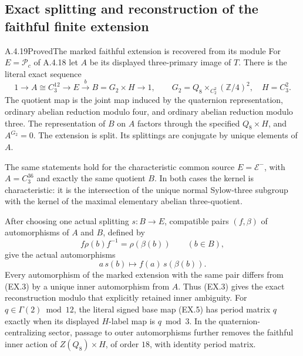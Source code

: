 \subsection{Exact splitting and reconstruction of the faithful finite extension}

\begin{result}{A.4.19}{Proved}{The marked faithful extension is recovered from its module}
For $E=\mathcal P_c$ of A.4.18 let $A$ be its displayed
three-primary image of $T$.  There is the literal exact
sequence
\[
 1\longrightarrow A\cong C_3^{12}\longrightarrow E
   \xrightarrow{\ b\ }B=G_2\times H\longrightarrow1,
 \qquad
 G_2=Q_8\mathbin{\times}_{C_2^2}(\mathbb Z/4)^2,
 \quad H=C_3^2.                                         \tag{EX.1}
\]
The quotient map is the joint map induced by the
quaternion representation, ordinary abelian reduction
modulo four, and ordinary abelian reduction modulo three.
The representation of $B$ on $A$ factors through the
specified $Q_8\times H$, and $A^{G_2}=0$.
The extension is split.  Its splittings are conjugate by
unique elements of $A$.

The same statements hold for the characteristic common
source $E=\mathcal E^-$, with $A=C_3^{36}$ and exactly the
same quotient $B$.  In both cases the kernel is
characteristic: it is the intersection of the unique
normal Sylow-three subgroup with the kernel of the
maximal elementary abelian three-quotient.

After choosing one actual splitting $s:B\to E$, compatible
pairs $(f,\beta)$ of automorphisms of $A$ and $B$, defined
by
\[
 f\rho(b)f^{-1}=\rho(\beta(b))\qquad(b\in B),             \tag{EX.2}
\]
give the actual automorphisms
\[
       a\,s(b)\longmapsto f(a)\,s(\beta(b)).             \tag{EX.3}
\]
Every automorphism of the marked extension with the same
pair differs from (EX.3) by a unique inner automorphism
from $A$.  Thus (EX.3) gives the exact reconstruction
modulo that explicitly retained inner ambiguity.
For $q\in\Gamma(2)\bmod12$, the literal signed base map
(EX.5) has period matrix $q$ exactly when its displayed
$H$-label map is $q\bmod3$.  In the quaternion-centralizing
sector, passage to outer automorphisms further removes
the faithful inner action of $Z(Q_8)\times H$, of order
$18$, with identity period matrix.
\end{result}

